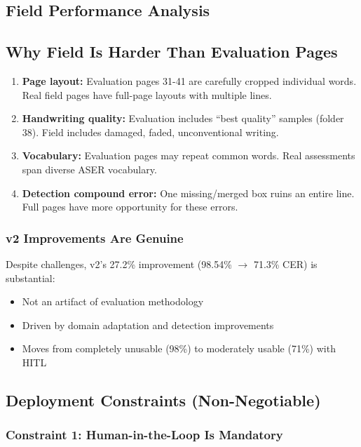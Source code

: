 \documentclass[14pt,a4paper]{article}
\begin{document}
\subsection{Field Performance Analysis}

\subsection{Why Field Is Harder Than Evaluation Pages}

\begin{enumerate}
    \item \textbf{Page layout:} Evaluation pages 31-41 are carefully cropped individual words. Real field pages have full-page layouts with multiple lines.
    \item \textbf{Handwriting quality:} Evaluation includes ``best quality'' samples (folder 38). Field includes damaged, faded, unconventional writing.
    \item \textbf{Vocabulary:} Evaluation pages may repeat common words. Real assessments span diverse ASER vocabulary.
    \item \textbf{Detection compound error:} One missing/merged box ruins an entire line. Full pages have more opportunity for these errors.
\end{enumerate}

\subsubsection{v2 Improvements Are Genuine}

Despite challenges, v2's 27.2\% improvement (98.54\% $\to$ 71.3\% CER) is substantial:
\begin{itemize}
    \item Not an artifact of evaluation methodology
    \item Driven by domain adaptation and detection improvements
    \item Moves from completely unusable (98\%) to moderately usable (71\%) with HITL
\end{itemize}

\subsection{Deployment Constraints (Non-Negotiable)}

\subsubsection{Constraint 1: Human-in-the-Loop Is Mandatory}
\end{document}
